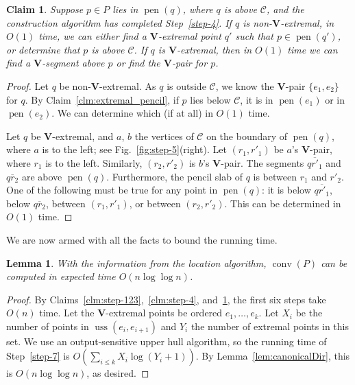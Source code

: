 \documentclass[letterpaper,11pt]{article}
\newtheorem{lemma}[theorem]{Lemma}
\newtheorem{claim}[theorem]{Claim}
\DeclareMathOperator{\UH}{conv}
\DeclareMathOperator{\pen}{pen}
\DeclareMathOperator{\uss}{uss}
\newcommand{\cC}{\mathcal{C}}
\begin{document}
\begin{claim} \label{clm:step-56} 
  Suppose $p \in P$ lies in $\pen(q)$, 
  where $q$ is above $\cC$, and the 
  construction algorithm has completed 
  Step~\ref{step-4}.  If $q$ is 
  non-$\textbf{V}$-extremal, in $O(1)$ time, 
  we can either find a $\textbf{V}$-extremal point 
  $q'$ such that $p \in \pen(q')$, or determine
  that $p$ is above $\cC$. 
  If $q$ is $\textbf{V}$-extremal, then in $O(1)$ time
  we can find a $\textbf{V}$-segment above $p$ or find the 
  $\textbf{V}$-pair for $p$.
\end{claim}

\begin{proof} 
Let $q$ be non-$\textbf{V}$-extremal.  
As $q$ is outside $\cC$, we know 
the $\textbf{V}$-pair $\{e_1, e_2\}$ for $q$. 
By Claim~\ref{clm:extremal_pencil}, if
$p$ lies below $\cC$, it is in $\pen(e_1)$ or 
in $\pen(e_2)$. We can determine which (if at all)
in $O(1)$ time.

Let $q$ be $\textbf{V}$-extremal, and $a$,
$b$ the vertices of $\cC$ on the 
boundary of $\pen(q)$, where $a$ is to the
left; see Fig.~\ref{fig:step-5}(right). 
Let $(r_1, r'_1)$ be $a$'s $\textbf{V}$-pair,
where $r_1$ is to the left. 
Similarly, $(r_2, r'_2)$ is $b$'s $\textbf{V}$-pair.
The segments $\overline{qr'_1}$
and $\overline{qr_2}$ are above $\pen(q)$. Furthermore, 
the pencil slab of $q$
is between $r_1$ and $r'_2$. One of the 
following must be true for any point in $\pen(q)$:
it is below $\overline{qr'_1}$, below 
$\overline{qr_2}$, between $(r_1, r'_1)$,
or between $(r_2, r'_2)$. This can be 
determined in $O(1)$ time.
\end{proof}

We are now armed with all the facts to bound the running time.

\begin{lemma}
  With the information from the location algorithm, 
  $\UH(P)$ can be computed in expected time $O(n \log\log n)$.
\end{lemma}

\begin{proof} 
By Claims~\ref{clm:step-123},~\ref{clm:step-4}, 
and~\ref{clm:step-56}, the  
first six steps take $O(n)$ time. Let 
the $\textbf{V}$-extremal points
be ordered $e_1, \dots, e_k$. Let 
$X_i$ be the number of points
in $\uss(e_i, e_{i+1})$ and $Y_i$ 
the number of extremal points
in this set. We use an output-sensitive
upper hull algorithm, so
the running time of Step~\ref{step-7} is 
$O(\sum_{i \leq k} X_i \log (Y_i+1))$.
By Lemma~\ref{lem:canonicalDir}, this
is $O(n \log\log n)$, as desired.
\end{proof}
\end{document}
